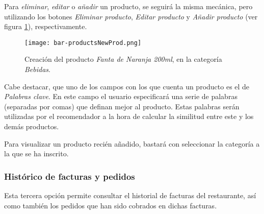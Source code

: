 Para \emph{eliminar}, \emph{editar} o \emph{añadir} un producto, se seguirá
la misma mecánica, pero utilizando los botones \emph{Eliminar producto},
\emph{Editar producto} y \emph{Añadir producto} (ver figura
\ref{fig:bar-productsNewProd}), respectivamente.

  \begin{figure}[H]
    \begin{center}
      \texttt{[image: bar-productsNewProd.png]}
      \caption{Creación del producto \emph{Fanta de Naranja 200ml}, en la
      categoría \emph{Bebidas}.}
      \label{fig:bar-productsNewProd}
    \end{center}
  \end{figure}

Cabe destacar, que uno de los campos con los que cuenta un producto es el de
\emph{Palabras clave}. En este campo el usuario especificará una serie de
palabras (separadas por comas) que definan mejor al producto. Estas palabras
serán utilizadas por el recomendador a la hora de calcular la similitud entre
este y los demás productos.

Para visualizar un producto recién añadido, bastará con seleccionar la 
categoría a la que se ha inscrito.

\subsubsection{Histórico de facturas y pedidos}
Esta tercera opción permite consultar el historial de facturas del
restaurante, así como también los pedidos que han sido cobrados en dichas
facturas.

